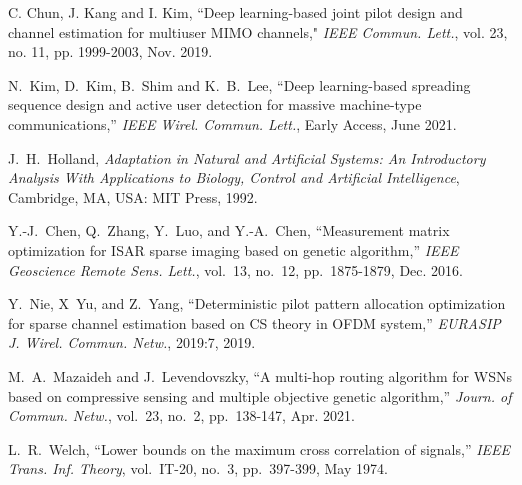 \documentclass[journal]{IEEEtran}
\numberwithin{const2}{const}
\begin{document}
\begin{thebibliography}{1}
	C. Chun, J. Kang and I. Kim, 
	``Deep learning-based joint pilot design and channel estimation for multiuser MIMO channels," 
	\emph{IEEE Commun. Lett.}, vol. 23, no. 11, pp. 1999-2003, Nov. 2019.
	
	N.~Kim, D.~Kim, B.~Shim and K.~B.~Lee, 
	``Deep learning-based spreading sequence design and active user detection for massive machine-type communications,'' 
	\emph{IEEE Wirel. Commun. Lett.}, Early Access, June 2021.
	
	J.~H.~Holland, \emph{Adaptation in Natural and Artificial Systems: An Introductory Analysis
	With Applications to Biology, Control and Artificial Intelligence}, Cambridge, MA, USA: MIT Press, 1992.
	
	Y.-J.~Chen, Q.~Zhang, Y.~Luo, and Y.-A.~Chen,
	``Measurement matrix optimization for ISAR sparse imaging based on genetic algorithm,''
	\emph{IEEE Geoscience Remote Sens. Lett.}, vol.~13, no.~12, pp.~1875-1879, Dec. 2016.
	
	Y.~Nie, X~Yu, and Z.~Yang,
	``Deterministic pilot pattern allocation optimization for sparse channel estimation based on CS theory in OFDM system,''
	\emph{EURASIP J. Wirel. Commun. Netw.}, 2019:7, 2019.		
	
	M.~A.~Mazaideh and J.~Levendovszky, 
	``A multi-hop routing algorithm for WSNs based on compressive sensing and multiple objective genetic algorithm,''
	\emph{Journ. of Commun. Netw.}, vol.~23, no.~2, pp.~138-147, Apr. 2021.	
	
	L.~R.~Welch,
	``Lower bounds on the maximum cross correlation of signals,''
	\emph{IEEE Trans. Inf. Theory}, vol.~IT-20, no.~3, pp.~397-399, May 1974.
	
	\newpage
	
%	
%	
%	
%	
	


\end{thebibliography}
\end{document}
